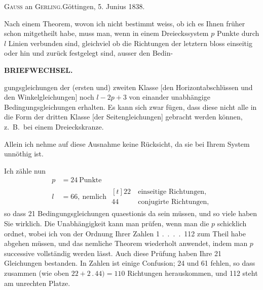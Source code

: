 \bigskip
\begin{center}\textsc{Gauss} an \textsc{Gerling}.\quad Göttingen, 5. Junius 1838.\end{center}

Nach einem Theorem, wovon ich nicht bestimmt weiss, ob ich es Ihnen
früher schon mitgetheilt habe, muss man, wenn in einem Dreieckssystem $p$
Punkte durch $l$ Linien verbunden sind, gleichviel ob die Richtungen der letztern
bloss einseitig oder hin und zurück festgelegt sind, ausser den Bedin-\par
\makeatletter
\def\ps@gaussIXfortyonestar{\def\@oddhead{}\def\@evenhead{}\def\@oddfoot{\hfil41\textsuperscript{*}\hspace{2em}}\let\@evenfoot\@oddfoot}
\makeatother
\thispagestyle{gaussIXfortyonestar}
\clearpage
{}\hfill\textbf{BRIEFWECHSEL.}\par\medskip
\noindent gungsgleichungen der (ersten und) zweiten Klasse [den Horizontabschlüssen
und den Winkelgleichungen] noch $l-2p+3$ von einander unabhängige Bedingungsgleichungen
erhalten.  Es kann sich
zwar fügen, dass diese nicht alle in die Form der dritten Klasse [der Seitengleichungen]
gebracht werden können, z.\ B.\ bei einem Dreieckskranze.
\begin{center}
\end{center}

Allein ich nehme auf diese Ausnahme keine Rücksicht, da sie bei Ihrem
System unnöthig ist.

Ich zähle nun
\[
\begin{aligned}
p&=24\ \text{Punkte}\\
l&=66,\ \text{nemlich }\begin{aligned}[t]22\ &\text{einseitige Richtungen,}\\44\ &\text{conjugirte Richtungen,}\end{aligned}
\end{aligned}
\]
so dass 21 Bedingungsgleichungen quaestionis da sein müssen, und so viele
haben Sie wirklich. Die Unabhängigkeit kann man prüfen, wenn man die $p$
schicklich ordnet, wobei ich von der Ordnung Ihrer Zahlen 1 .\ .\ .\ .\ 112 zum
Theil habe abgehen müssen, und das nemliche Theorem wiederholt anwendet,
indem man $p$ successive vollständig werden lässt. Auch diese Prüfung haben
Ihre 21 Gleichungen bestanden. In  Zahlen ist einige Confusion; 24
und 61 fehlen, so dass zusammen (wie oben $22+2\mathbin{.}44)=110$ Richtungen herauskommen,
und 112 steht am unrechten Platze.

